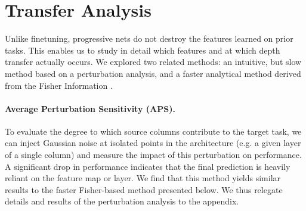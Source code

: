 \section{Transfer Analysis}
\label{sec_transfer}

Unlike finetuning, progressive nets do not destroy the features learned on
prior tasks. This enables us to study in detail which features and at which
depth transfer actually occurs. We explored two related methods: an intuitive,
but slow method based on a perturbation analysis, and a faster analytical method
derived from the Fisher Information \cite{amari98natural}.

\paragraph{Average Perturbation Sensitivity (APS).} To evaluate the degree to
which source columns contribute to the target task, we can inject
Gaussian noise at isolated points in the architecture (e.g. a given
layer of a single column) and measure the impact of this perturbation
on performance. A significant drop in performance indicates that the
final prediction is heavily reliant on the feature map or
layer. We find that this method yields similar results to the faster
Fisher-based method presented below. We thus relegate details and
results of the perturbation analysis to the appendix.

